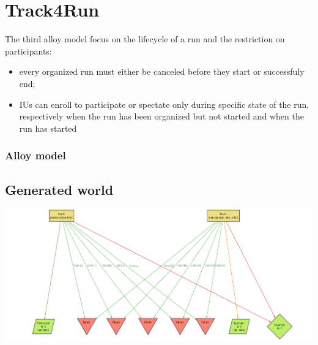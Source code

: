 \section{Track4Run}
The third alloy model focus on the lifecycle of a run and the restriction on participants:
\begin{itemize}
\item every organized run must either be canceled before they start or successfuly end;
\item IUs can enroll to participate or spectate only during specific state of the run, respectively when the run has been organized but not started and when the run has started
\end{itemize}
\subsubsection{Alloy model}

\subsection{Generated world}
\includegraphics[width = 0.8\textheight, angle=90]{sections/alloy/GenWorldT4R.png}
